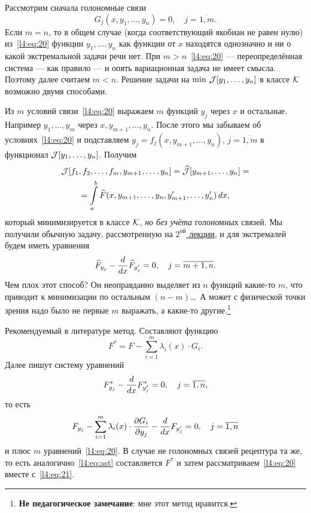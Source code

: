 \begin{enumerateD}
	Рассмотрим сначала голономные связи
	\begin{equation}
		\label{l4:eq:20}
		 G_j(x,y_1,\ldots,y_n)=0,\quad j=\overline{1,m}.
	\end{equation}
	Если $m=n$, то в общем случае (когда соответствующий якобиан не равен нулю) из~\eqref{l4:eq:20} функции $y_1,\ldots,y_n$ как функции от $x$ находятся однозначно и ни о какой экстремальной задачи речи нет. При $m>n$~\eqref{l4:eq:20} --- переопределённая система --- как правило --- и опять вариационная задача не имеет смысла. Поэтому далее считаем $m<n$. Решение задачи на $\min\,\mathcal{J}[y_1,\ldots,y_n]$ в классе $\mathcal{K}$ возможно двумя способами. 
	\begin{enumerateD}
		\item Из $m$ условий связи~\eqref{l4:eq:20} выражаем $m$ функций $y_j$ через $x$ и остальные. Например $y_1,\ldots,y_m$ через $x,y_{m+1},\ldots,y_n$. После этого мы забываем об условиях~\eqref{l4:eq:20} и подставляем $y_j=f_j(x,y_{m+1},\ldots,y_{n})$, $j=\overline{1,m}$ в функционал $\mathcal{J}[y_1,\ldots,y_n]$. Получим
		\begin{multline*}
			\mathcal{J}[f_1,f_2,\ldots,f_m,y_{m+1},\ldots,y_n]=\widehat{\mathcal{J}}[y_{m+1},\ldots,y_n]=\\=\int\limits_a^b \widehat{F}(x,y_{m+1},\ldots,y_n,y'_{m+1},\ldots,y'_n)\,dx,
		\end{multline*}  
		который минимизируется в классе $\mathcal{K}$, \emph{но без учёта} голономных связей. Мы получили обычную задачу, рассмотренную на \hyperref[lecture2]{$2^{\text{ой}}$  лекции}, и для экстремалей будем иметь уравнения
		\begin{equation*}
			 \widehat{F}_{y_j}-\frac{d}{dx}\widehat{F}_{y'_j}=0,\quad j=\overline{m+1,n}.
		\end{equation*} 
		Чем плох этот способ? Он неоправданно выделяет из $n$ функций какие-то $m$, что приводит к минимизации по остальным $(n-m)$\dots\  А может с физической точки зрения надо было не первые $m$ выражать, а какие-то другие.\footnote{\textbf{Не педагогическое замечание}: мне этот метод нравится.}
		\item Рекомендуемый в литературе метод. Составляют функцию
		\begin{equation}
			\label{l4:eq:ast}
			 F^{\ast}=F-\sum\limits_{i=1}^{m}\lambda_i(x)\cdot G_i.\tag{$\ast$}
		\end{equation} 
		Далее пишут систему уравнений
		\begin{equation}
			\label{l4:eq:21}
			 F^{\ast}_{y_j}-\frac{d}{dx}F^{\ast}_{y'_j}=0,\quad j=\overline{1,n},
		\end{equation}
		то есть 
		\begin{equation*}
			 F_{y_j}-\sum\limits_{i=1}^m\lambda_i(x)\cdot\frac{\partial G_i}{\partial y_j}-\frac{d}{dx}F_{y_j'}=0,\quad j=\overline{1,n}
		\end{equation*}
		и плюс $m$ уравнений~\eqref{l4:eq:20}.
		В случае не голономных связей рецептура та же, то есть аналогично~\eqref{l4:eq:ast} составляется $	F^{\ast}$ и затем рассматриваем~\eqref{l4:eq:20} вместе с~\eqref{l4:eq:21}.
	\end{enumerateD}
\end{enumerateD}

